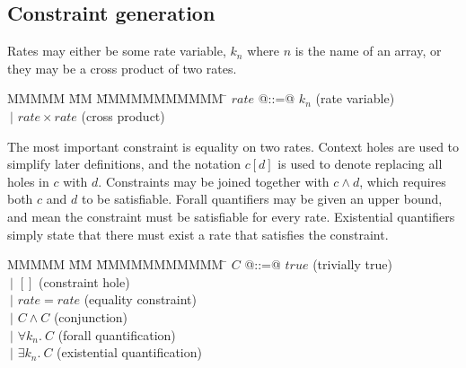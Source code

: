 \newcommand{\constr}[1]{\llbracket #1 \rrbracket}
\newcommand{\hole}[0]{[]}
\newcommand{\fillhole}[2]{#1\left[#2\right]}

\subsection{Constraint generation}
Rates may either be some rate variable, $k_n$ where $n$ is the name of an array, or they may be a cross product of two rates.

\begin{tabbing}
MMMMM       \= MM \= MMMMMMMMMMM \= \kill
$rate$      \> @::=@ \> $k_n$               \> (rate variable)\\
            \> $~|$  \> $rate \times rate$  \> (cross product) \\
\end{tabbing}

The most important constraint is equality on two rates.
Context holes are used to simplify later definitions, and the notation $\fillhole{c}{d}$ is used to denote replacing all holes in $c$ with $d$.
Constraints may be joined together with $c \wedge d$, which requires both $c$ and $d$ to be satisfiable.
Forall quantifiers may be given an upper bound, and mean the constraint must be satisfiable for every rate.
Existential quantifiers simply state that there must exist a rate that satisfies the constraint.


\begin{tabbing}
MMMMM       \= MM \= MMMMMMMMMMM \= \kill
$C$          \> @::=@ \> $true$                                 \> (trivially true) \\
             \> $~|$  \> $\hole$                                \> (constraint hole) \\
             \> $~|$  \> $rate = rate$                          \> (equality constraint) \\
             \> $~|$  \> $C \wedge C$                           \> (conjunction) \\
             \> $~|$  \> $\forall k_n.\ C$                      \> (forall quantification) \\
             \> $~|$  \> $\exists k_n.\ C$                      \> (existential quantification)\\
\end{tabbing}


